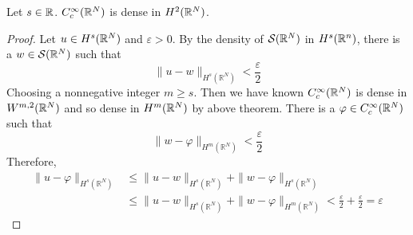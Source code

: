 \begin{thm}
	Let $s \in \mathbb{R}$. $C_c^\infty(\mathbb{R}^N)$ is dense in $H^2(\mathbb{R}^N)$.
\end{thm}
\begin{proof}
	Let $u \in H^s(\mathbb{R}^N)$ and $\varepsilon > 0$. By the density of $\mathcal{S}(\mathbb{R}^N)$ in $H^s(\mathbb{R}^n)$, there is a $w \in \mathcal{S}(\mathbb{R}^N)$ such that
	\begin{equation*}
		\|u-w\|_{H^s\left(\mathbb{R}^N\right)}<\frac{\varepsilon}{2}
	\end{equation*}
	Choosing a nonnegative integer $m \geq s$. Then we have known $C_c^\infty(\mathbb{R}^N)$ is dense in $W^{m,2}(\mathbb{R}^N)$ and so dense in $H^m(\mathbb{R}^N)$ by above theorem. There is a $\varphi \in C^\infty_c(\mathbb{R}^N)$ such that
	\begin{equation*}
		\|w-\varphi\|_{H^m\left(\mathbb{R}^N\right)}<\frac{\varepsilon}{2}
	\end{equation*}
	Therefore,
	\begin{equation*}
		\begin{aligned}
			\|u-\varphi\|_{H^s\left(\mathbb{R}^N\right)} & \leq\|u-w\|_{H^s\left(\mathbb{R}^N\right)}+\|w-\varphi\|_{H^s\left(\mathbb{R}^N\right)} \\
			& \leq\|u-w\|_{H^s\left(\mathbb{R}^N\right)}+\|w-\varphi\|_{H^m\left(\mathbb{R}^N\right)}<\frac{\varepsilon}{2}+\frac{\varepsilon}{2}=\varepsilon
		\end{aligned}
	\end{equation*}
\end{proof}

